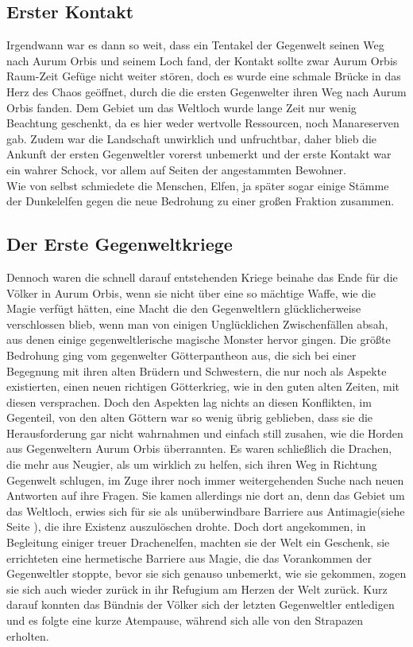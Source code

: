 \documentclass[a4paper,12pt,oneside]{book}
\begin{document}
\subsection{Erster Kontakt}
Irgendwann war es dann so weit, dass ein Tentakel der Gegenwelt seinen Weg nach Aurum Orbis und seinem Loch fand, der Kontakt sollte zwar Aurum Orbis Raum-Zeit Gefüge nicht weiter stören, doch es wurde eine schmale Brücke in das Herz des Chaos geöffnet, durch die die ersten Gegenwelter ihren Weg nach Aurum Orbis fanden.
Dem Gebiet um das Weltloch wurde lange Zeit nur wenig Beachtung geschenkt, da es hier weder wertvolle Ressourcen, noch Manareserven gab. Zudem war die Landschaft unwirklich und unfruchtbar, daher blieb die Ankunft der ersten Gegenweltler vorerst unbemerkt und der erste Kontakt war ein wahrer Schock, vor allem auf Seiten der angestammten Bewohner. 
\\Wie von selbst schmiedete die Menschen, Elfen, ja später sogar einige Stämme der Dunkelelfen gegen die neue Bedrohung zu einer großen Fraktion zusammen.

\subsection{Der Erste Gegenweltkriege}
Dennoch waren die schnell darauf entstehenden Kriege beinahe das Ende für die Völker in Aurum Orbis, wenn sie nicht über eine so mächtige Waffe, wie die Magie verfügt hätten, eine Macht die den Gegenweltlern glücklicherweise verschlossen blieb, wenn man von einigen Unglücklichen Zwischenfällen absah, aus denen einige gegenweltlerische magische Monster hervor gingen. Die größte Bedrohung ging vom gegenwelter Götterpantheon aus, die sich bei einer Begegnung mit ihren alten Brüdern und Schwestern, die nur noch als Aspekte existierten, einen neuen richtigen Götterkrieg, wie in den guten alten Zeiten, mit diesen versprachen. Doch den Aspekten lag nichts an diesen Konflikten, im Gegenteil, von den alten Göttern war so wenig übrig geblieben, dass sie die Herausforderung gar nicht wahrnahmen und einfach still zusahen, wie die Horden aus Gegenweltern Aurum Orbis überrannten. Es waren schließlich die Drachen, die mehr aus Neugier, als um wirklich zu helfen, sich ihren Weg in Richtung Gegenwelt schlugen, im Zuge ihrer noch immer weitergehenden Suche nach neuen Antworten auf ihre Fragen. Sie kamen allerdings nie dort an, denn das Gebiet um das Weltloch, erwies sich für sie als unüberwindbare Barriere aus Antimagie(siehe Seite \pageref{Antimagie}), die ihre Existenz auszulöschen drohte. Doch dort angekommen, in Begleitung einiger treuer Drachenelfen, machten sie der Welt ein Geschenk, sie errichteten eine hermetische Barriere aus Magie, die das Vorankommen der Gegenweltler stoppte, bevor sie sich genauso unbemerkt, wie sie gekommen, zogen sie sich auch wieder zurück in ihr Refugium am Herzen der Welt zurück. Kurz darauf konnten das Bündnis der Völker sich der letzten Gegenweltler entledigen und es folgte eine kurze Atempause, während sich alle von den Strapazen erholten.
\end{document}
